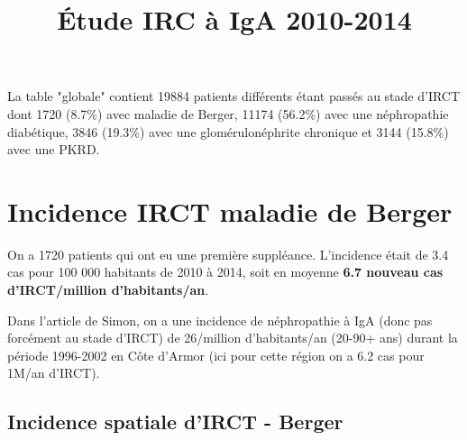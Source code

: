 \documentclass[11pt,a4paper]{article}\usepackage[]{graphicx}\usepackage[]{color}
\title{Étude IRC à IgA 2010-2014}
\begin{document}
\maketitle

\tableofcontents

\newpage























La table "globale" contient 19884 patients différents étant passés au stade d'IRCT dont 1720 (8.7\%) avec maladie de Berger, 11174 (56.2\%) avec une néphropathie diabétique, 3846 (19.3\%) avec une glomérulonéphrite chronique et 3144 (15.8\%) avec une PKRD.

\section{Incidence IRCT maladie de Berger}



On a 1720 patients qui ont eu une première suppléance. L'incidence était de 3.4 cas pour 100 000 habitants de 2010 à 2014, soit en moyenne \textbf{6.7 nouveau cas d'IRCT/million d'habitants/an}. 

Dans l'article de Simon, on a une incidence de néphropathie à IgA (donc pas forcément au stade d'IRCT) de 26/million d'habitants/an (20-90+ ans) durant la période 1996-2002 en Côte d'Armor (ici pour cette région on a 6.2 cas pour 1M/an d'IRCT). %

  \subsection{Incidence spatiale d'IRCT - Berger}
\end{document}
